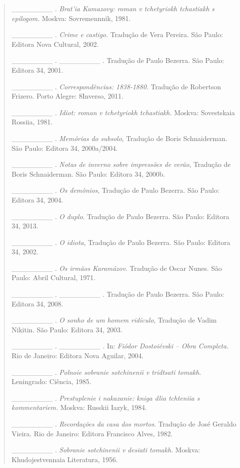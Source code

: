 {\begin{quote}
\begin{Parskip}
\_\_\_\_\_\_\_\_ . \emph{Brat'ia Kamazovy: roman v tchetyriokh
tchastiakh s epilogom.} Moskva: Sovremennnik, 1981.

\_\_\_\_\_\_\_\_ . \emph{Crime e castigo.} Tradução de Vera Pereira. São
Paulo: Editora Nova Cultural, 2002.

\_\_\_\_\_\_\_\_ . \_\_\_\_\_\_\_\_ . Tradução de Paulo Bezerra. São
Paulo: Editora 34, 2001.

\_\_\_\_\_\_\_\_ . \emph{Correspondências: 1838-1880.} Tradução de
Robertson Frizero. Porto Alegre: 8Inverso, 2011.

\_\_\_\_\_\_\_\_ . \emph{Idiot: roman v tchetyriokh tchastiakh.} Moskva:
Sovestskaia Rossiia, 1981.

\_\_\_\_\_\_\_\_ . \emph{Memórias do subsolo}, Tradução de Boris
Schnaiderman. São Paulo: Editora 34, 2000a/2004.

\_\_\_\_\_\_\_\_ . \emph{Notas de inverno sobre impressões de verão},
Tradução de Boris Schnaiderman. São Paulo: Editora 34, 2000b.

\_\_\_\_\_\_\_\_ . \emph{Os demônios}, Tradução de Paulo Bezerra. São
Paulo: Editora 34, 2004.

\_\_\_\_\_\_\_\_ . \emph{O duplo}. Tradução de Paulo Bezerra. São Paulo:
Editora 34, 2013.

\_\_\_\_\_\_\_\_ . \emph{O idiota}, Tradução de Paulo Bezerra. São
Paulo: Editora 34, 2002.

\_\_\_\_\_\_\_\_ . \emph{Os irmãos Karamázov}. Tradução de Oscar Nunes.
São Paulo: Abril Cultural, 1971.

\_\_\_\_\_\_\_\_ . \_\_\_\_\_\_\_\_ . Tradução de Paulo Bezerra. São
Paulo: Editora 34, 2008.

\_\_\_\_\_\_\_\_ . \emph{O sonho de um homem ridículo}, Tradução de
Vadim Nikitin. São Paulo: Editora 34, 2003.

\_\_\_\_\_\_\_\_ . \_\_\_\_\_\_\_\_ \emph{.} In: \emph{Fiódor
Dostoiévski -- Obra Completa.} Rio de Janeiro: Editora Nova Aguilar,
2004.

\_\_\_\_\_\_\_\_ . \emph{Polnoie sobranie sotchinenii v tridtsati
tomakh}. Leningrado: Ciência, 1985.

\_\_\_\_\_\_\_\_ . \emph{Prestuplenie i nakazanie: kniga dlia tchteniia
s kommentariem.} Moskva: Russkii Iazyk, 1984.

\_\_\_\_\_\_\_\_ . \emph{Recordações da casa dos mortos}. Tradução de
José Geraldo Vieira. Rio de Janeiro: Editora Francisco Alves, 1982.

\_\_\_\_\_\_\_\_ . \emph{Sobranie sotchinenii v desiati tomakh.} Moskva:
Khudojestvennaia Literatura, 1956.


\end{Parskip}
\end{quote}}
